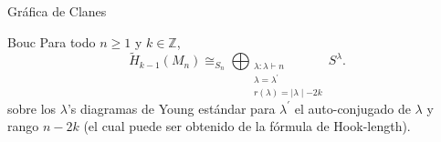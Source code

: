 \documentclass[final,xcolor=svgnames]{beamer}
\begin{document}
\begin{frame}{}
\begin{columns}
\begin{column}{0.5\textwidth}
\begin{block}{Gráfica de Clanes}
      \end{block}

      \begin{block}{Bouc}
          Para todo $n\geq1$ y $k\in \mathbb{Z}$,
          \begin{equation*}
            \widetilde H_{k-1}(M_{n})\cong_{S_{n}}\bigoplus_{\substack{\lambda:\lambda\vdash n\\
              \lambda=\lambda^{'}\\r(\lambda)=\mid \lambda \mid-2k}} S^{\lambda}.
          \end{equation*}
          sobre los $\lambda$'s diagramas de Young estándar para $\lambda^{'}$
          el auto-conjugado de $\lambda$ y rango $n-2k$ (el cual puede ser
          obtenido de la fórmula de Hook-length).
      \end{block}
    \end{column}
  \end{columns}


\end{frame}
\end{document}
